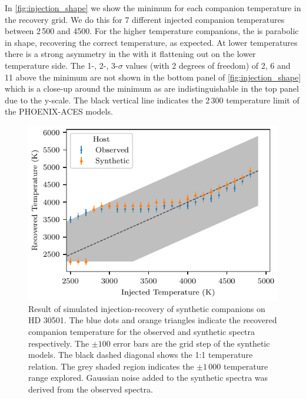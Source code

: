 In \cref{fig:injection_shape} we show the minimum \textchisquared{} for each companion temperature in the recovery grid.
We do this for 7 different injected companion temperatures between 2\,500 and 4500\K{}.
For the higher temperature companions, the \textchisquared{} is parabolic in shape, recovering the correct temperature, as expected.
At lower temperatures there is a strong asymmetry in the \textchisquared{} with it flattening out on the lower temperature side.
The 1-, 2-, 3-\(\sigma\) values (with 2 degrees of freedom) of 2, 6 and 11 above the minimum \textchisquared{} are not shown in the bottom panel of \cref{fig:injection_shape} which is a close-up around the minimum \textchisquared{} as are indistinguishable in the top panel due to the \textchisquared{} y-scale.
The black vertical line indicates the 2\,300\K{} temperature limit of the {PHOENIX-ACES} models.

\begin{figure}
    \centering
    \includegraphics[width=0.6\linewidth]{figures/companion_recovery/inject_recovery_hd30501.pdf}
    \caption{Result of simulated injection-recovery of synthetic companions on {HD 30501}.
    The blue dots and orange triangles indicate the recovered companion temperature for the observed and synthetic spectra respectively.
    The \(\pm100\)\K{} error bars are the grid step of the synthetic models.
    The black dashed diagonal shows the 1:1 temperature relation.
    The grey shaded region indicates the \(\pm1\,000\)\K{} temperature range explored.
    Gaussian noise added to the synthetic spectra was derived from the observed spectra.}
    \label{fig:injectrecoveryhd30501}
\end{figure}


